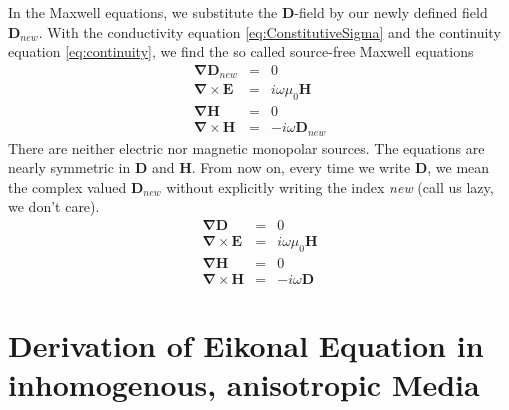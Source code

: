 \documentclass[12pt,a4paper,twoside,openright,BCOR10mm,headsepline,titlepage,abstracton,chapterprefix,final]{scrreprt}
\newcommand\Vector[1]{{\mathbf{#1}}}
\newcommand\vacuum{0}
\newcommand\Nabla{\Vector{\nabla}}
\newcommand\scalarEfield{E}
\newcommand\scalarHfield{H}
\newcommand\scalarDfield{D}
\newcommand\Efield{\Vector{\scalarEfield}}
\newcommand\Hfield{\Vector{\scalarHfield}}
\newcommand\Dfield{\Vector{\scalarDfield}}
\newcommand\vacuumpermeability{\mu_{\vacuum}}
\begin{document}
In the Maxwell equations, we substitute the $\Dfield$-field by our newly defined field $\Dfield_{new}$.
With the conductivity equation \ref{eq:ConstitutiveSigma} and the continuity equation \ref{eq:continuity}, we find the so called source-free Maxwell equations
\begin{subequations}
\begin{eqnarray}
  \Nabla \Dfield_{new} &=& 0 					\\
  \Nabla \times \Efield &=& i \omega \vacuumpermeability \Hfield	\\
  \Nabla \Hfield &=& 0  					\\
  \Nabla \times \Hfield &=& - i \omega \Dfield_{new}  		
\end{eqnarray}
\end{subequations}
There are neither electric nor magnetic monopolar sources.
The equations are nearly symmetric in $\Dfield$ and $\Hfield$.
From now on, every time we write $\Dfield$, we mean the complex valued $\Dfield_{new}$ without explicitly writing the index \emph{new} (call us lazy, we don't care).
\begin{subequations}
\begin{eqnarray}
  \Nabla \Dfield &=& 0 					\\
  \Nabla \times \Efield &=& i \omega \vacuumpermeability \Hfield	\\
  \Nabla \Hfield &=& 0  					\\
  \Nabla \times \Hfield &=& - i \omega \Dfield  		
\end{eqnarray}
\label{eq:sourcefreemaxwell}
\end{subequations}

\section{Derivation of Eikonal Equation in inhomogenous, anisotropic Media}
{\color{red}{This section needs heavy checking as I am not sure about some steps!}}
\end{document}
